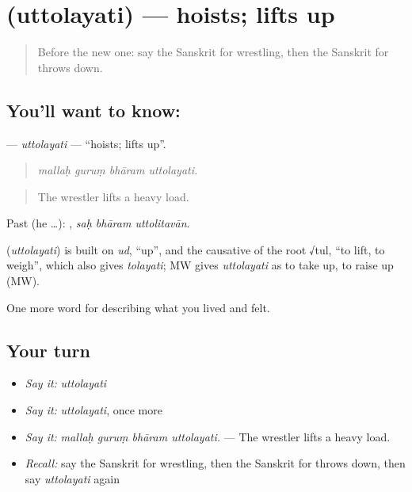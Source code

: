 \section[\texorpdfstring{\sk{उत्तोलयति} (uttolayati)}{उत्तोलयति (uttolayati)}]{ (uttolayati) — hoists; lifts up}

\label{lesson:SA-C525-uttolayati}



\begin{quote}
Before the new one: say the Sanskrit for wrestling, then the Sanskrit for throws down.
\end{quote}

\subsection*{You'll want to know: }
\textbf{} — \emph{uttolayati} — \textquotedblleft{}hoists; lifts up\textquotedblright{}.

\begin{quote}
   
\end{quote}

\begin{quote}
\emph{mallaḥ guruṃ bhāram uttolayati.}
\end{quote}

\begin{quote}
The wrestler lifts a heavy load.
\end{quote}

Past (he …):   , \emph{saḥ bhāram uttolitavān}.

\begin{cousinweb}
\textbf{} (\emph{uttolayati}) is built on \emph{ud}, \textquotedblleft{}up\textquotedblright{}, and the causative of the root √tul, \textquotedblleft{}to lift, to weigh\textquotedblright{}, which also gives \emph{tolayati}; MW gives \emph{uttolayati} as to take up, to raise up (MW).
\end{cousinweb}

\begin{grammarlens}[title={What you've built}]
One more word for describing what you lived and felt.
\end{grammarlens}

\subsection*{Your turn}
\begin{itemize}
\raggedright
  \item \emph{Say it:} \emph{uttolayati}
  \item \emph{Say it:} \emph{uttolayati}, once more
  \item \emph{Say it:} \emph{mallaḥ guruṃ bhāram uttolayati.} — The wrestler lifts a heavy load.
  \item \emph{Recall:} say the Sanskrit for wrestling, then the Sanskrit for throws down, then say \emph{uttolayati} again
\end{itemize}

